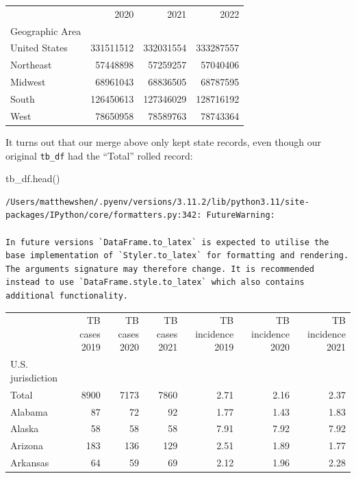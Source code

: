 \documentclass[
  letterpaper,
  DIV=11,
  numbers=noendperiod]{scrreprt}
\newenvironment{Shaded}{\begin{snugshade}}{\end{snugshade}}
\newcommand{\NormalTok}[1]{\textcolor[rgb]{0.00,0.23,0.31}{#1}}
\begin{document}
\begin{tabular}{lrrr}
\toprule
{} &       2020 &       2021 &       2022 \\
Geographic Area &            &            &            \\
\midrule
United States   &  331511512 &  332031554 &  333287557 \\
Northeast       &   57448898 &   57259257 &   57040406 \\
Midwest         &   68961043 &   68836505 &   68787595 \\
South           &  126450613 &  127346029 &  128716192 \\
West            &   78650958 &   78589763 &   78743364 \\
\bottomrule
\end{tabular}

It turns out that our merge above only kept state records, even though
our original \texttt{tb\_df} had the ``Total'' rolled record:

\begin{Shaded}
\begin{Highlighting}[]
\NormalTok{tb\_df.head()}
\end{Highlighting}
\end{Shaded}

\begin{verbatim}
/Users/matthewshen/.pyenv/versions/3.11.2/lib/python3.11/site-packages/IPython/core/formatters.py:342: FutureWarning:

In future versions `DataFrame.to_latex` is expected to utilise the base implementation of `Styler.to_latex` for formatting and rendering. The arguments signature may therefore change. It is recommended instead to use `DataFrame.style.to_latex` which also contains additional functionality.
\end{verbatim}

\begin{tabular}{lrrrrrr}
\toprule
{} &  TB cases 2019 &  TB cases 2020 &  TB cases 2021 &  TB incidence 2019 &  TB incidence 2020 &  TB incidence 2021 \\
U.S. jurisdiction &                &                &                &                    &                    &                    \\
\midrule
Total             &           8900 &           7173 &           7860 &               2.71 &               2.16 &               2.37 \\
Alabama           &             87 &             72 &             92 &               1.77 &               1.43 &               1.83 \\
Alaska            &             58 &             58 &             58 &               7.91 &               7.92 &               7.92 \\
Arizona           &            183 &            136 &            129 &               2.51 &               1.89 &               1.77 \\
Arkansas          &             64 &             59 &             69 &               2.12 &               1.96 &               2.28 \\
\bottomrule
\end{tabular}
\end{document}
